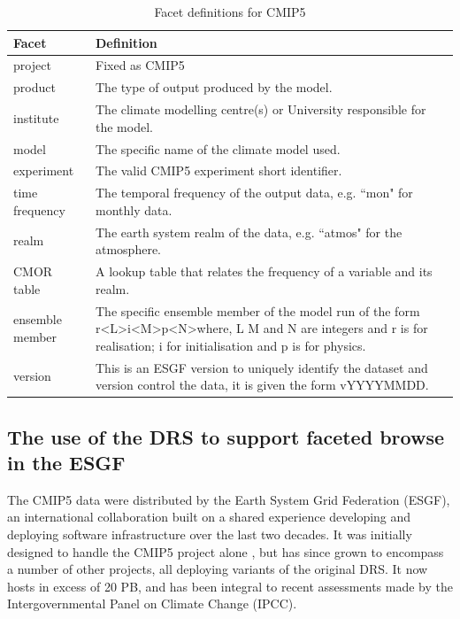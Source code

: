 \documentclass[final,1p,times,twocolumn,authoryear]{elsarticle}
\begin{document}
\begin{table}[ht!]
\label{tab:cmip5}
\begin{tabular}{|p{3cm}|p{9.5cm}|}
\hline
\textbf{Facet}  & \textbf{Definition}  \\ \hline
project         & Fixed as CMIP5\\ \hline
product         & The type of output produced by the model. \\ \hline
institute       & The climate modelling centre(s) or University responsible for the model. \\ \hline
model           & The specific name of the climate model used.  \\ \hline
experiment      & The valid CMIP5 experiment short identifier.  \\ \hline
time frequency  & The temporal frequency of the output data, e.g. ``mon" for monthly data.  \\ \hline
realm           & The earth system realm of the data, e.g. ``atmos" for the atmosphere. \\ \hline
CMOR table      & A lookup table that relates the frequency of a variable and its realm.    \\ \hline
ensemble member & The specific ensemble member of the model run of the form r\textless{}L\textgreater{}i\textless{}M\textgreater{}p\textless{}N\textgreater where, L M and N are integers and r is for realisation; i for initialisation and p is for physics. \\ \hline
version         & This is an ESGF version to uniquely identify the dataset and version control the data, it is given the form vYYYYMMDD. \\
\hline

\end{tabular}
\caption{Facet definitions for CMIP5 \label{cmip5-drs}}
\end{table}


\subsection{The use of the DRS to support faceted browse in the ESGF}

The CMIP5 data were distributed by the Earth System Grid Federation (ESGF), an international collaboration built on a shared experience developing and deploying software infrastructure over the last two decades.
 It was initially designed to handle the CMIP5 project alone \citep{WilEA11_esgf}, but has since grown to encompass a number of other projects, all deploying variants of the original DRS.  
 It now hosts in excess of 20 PB, and has been integral to recent assessments made by the Intergovernmental Panel on Climate Change (IPCC).
\end{document}
